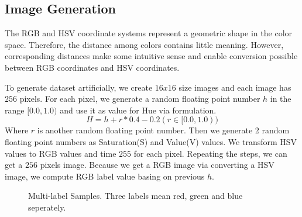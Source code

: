 \subsection{Image Generation}

The RGB and HSV coordinate systems represent a geometric shape in the color space. Therefore, the distance among colors contains little meaning. However, corresponding distances make some intuitive sense and enable conversion possible between RGB coordinates and HSV coordinates.

To generate dataset artificially, we create $16x16$ size images and each image has $256$ pixels. For each pixel, we generate a random floating point number $h$ in the range $[0.0, 1.0)$ and use it as value for Hue via formulation.
\begin{equation}\label{eq:FormulationHue}
H = h + r * 0.4 - 0.2 (r \in [0.0,1.0))
\end{equation}
Where $r$ is another random floating point number. Then we generate 2 random floating point numbers as Saturation(S) and Value(V) values. We transform HSV values to RGB values and time $255$ for each pixel. Repeating the steps, we can get a $256$ pixels image. Because we get a RGB image via converting a HSV image, we compute RGB label value basing on previous $h$.

\graphicspath{ {./Figures/} }
\begin{figure}[!htb]
\centering     %
{}
\caption{Multi-label Samples. Three labels mean red, green and blue seperately.}
\end{figure}

